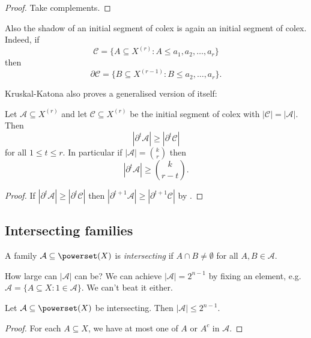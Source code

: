 \documentclass[a4paper]{article}
\newcommand{\shadow}{\partial}
\begin{document}
\begin{proof}
  Take complements.
\end{proof}

Also the shadow of an initial segment of colex is again an initial segment of colex. Indeed, if
\[
  \mathcal C = \{A \subseteq X^{(r)}: A \leq a_1,a_2,\dots,a_r\}
\]
then
\[
  \shadow \mathcal C = \{B \subseteq X^{(r - 1)}: B \leq a_2,\dots,a_r\}.
\]

Kruskal-Katona also proves a generalised version of itself:

\begin{corollary}
  Let \(\mathcal A \subseteq X^{(r)}\) and let \(\mathcal C \subseteq X^{(r)}\) be the initial segment of colex with \(|\mathcal C| = |\mathcal A|\). Then
  \[
    |\shadow^t \mathcal A| \geq |\shadow^t \mathcal C|
  \]
  for all \(1 \leq t \leq r\). In particular if \(|\mathcal A| = \binom{k}{r}\) then
  \[
    |\shadow^t \mathcal A| \geq \binom{k}{r - t}.
  \]
\end{corollary}

\begin{proof}
  If \(|\shadow^t \mathcal A| \geq |\shadow^t \mathcal C|\) then \(|\shadow^{t + 1}\mathcal A| \geq |\shadow^{t + 1} \mathcal C|\) by .
\end{proof}

\subsection{Intersecting families}

\begin{definition}
  A family \(\mathcal A \subseteq \powerset(X)\) is \emph{intersecting} if \(A \cap B \neq \emptyset\) for all \(A, B \in \mathcal A\).
\end{definition}

How large can \(|\mathcal A|\) can be? We can achieve \(|\mathcal A| = 2^{n - 1}\) by fixing an element, e.g.\ \(\mathcal A = \{A \subseteq X: 1 \in \mathcal A\}\). We can't beat it either.

\begin{proposition}
  Let \(\mathcal A \subseteq \powerset(X)\) be intersecting. Then \(|\mathcal A| \leq 2^{n - 1}\).
\end{proposition}

\begin{proof}
  For each \(A \subseteq X\), we have at most one of \(A\) or \(A^c\) in \(\mathcal A\).
\end{proof}
\end{document}
